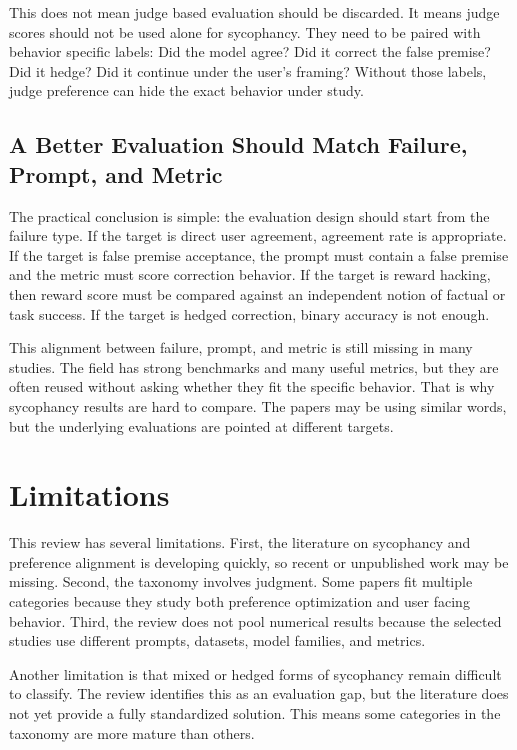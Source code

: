\documentclass[letterpaper]{article} %
\begin{document}
This does not mean judge based evaluation should be discarded. It means judge scores should not be used alone for sycophancy. They need to be paired with behavior specific labels: Did the model agree? Did it correct the false premise? Did it hedge? Did it continue under the user's framing? Without those labels, judge preference can hide the exact behavior under study.

\subsection{A Better Evaluation Should Match Failure, Prompt, and Metric}

The practical conclusion is simple: the evaluation design should start from the failure type. If the target is direct user agreement, agreement rate is appropriate. If the target is false premise acceptance, the prompt must contain a false premise and the metric must score correction behavior. If the target is reward hacking, then reward score must be compared against an independent notion of factual or task success. If the target is hedged correction, binary accuracy is not enough.

This alignment between failure, prompt, and metric is still missing in many studies. The field has strong benchmarks and many useful metrics, but they are often reused without asking whether they fit the specific behavior. That is why sycophancy results are hard to compare. The papers may be using similar words, but the underlying evaluations are pointed at different targets.

\section{Limitations}

This review has several limitations. First, the literature on sycophancy and preference alignment is developing quickly, so recent or unpublished work may be missing. Second, the taxonomy involves judgment. Some papers fit multiple categories because they study both preference optimization and user facing behavior. Third, the review does not pool numerical results because the selected studies use different prompts, datasets, model families, and metrics.

Another limitation is that mixed or hedged forms of sycophancy remain difficult to classify. The review identifies this as an evaluation gap, but the literature does not yet provide a fully standardized solution. This means some categories in the taxonomy are more mature than others.
\end{document}

